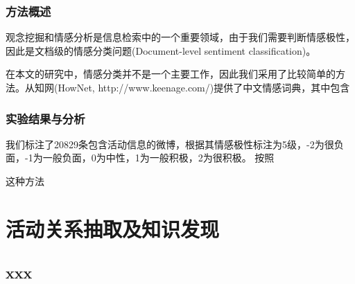 \subsection{方法概述}
观念挖掘和情感分析是信息检索中的一个重要领域，由于我们需要判断情感极性，因此是文档级的情感分类问题(Document-level sentiment classification)。

在本文的研究中，情感分类并不是一个主要工作，因此我们采用了比较简单的方法。从知网(HowNet, http://www.keenage.com/)提供了中文情感词典，其中包含

\subsection{实验结果与分析}
我们标注了20829条包含活动信息的微博，根据其情感极性标注为5级，-2为很负面，-1为一般负面，0为中性，1为一般积极，2为很积极。
按照

这种方法

\chapter{活动关系抽取及知识发现}
\section{xxx}
